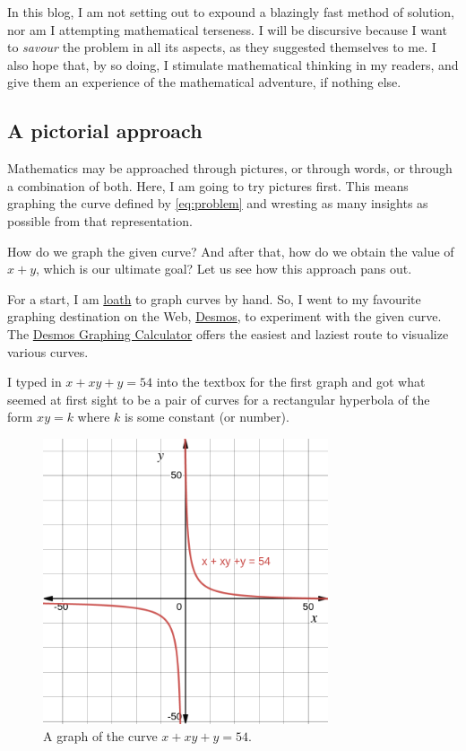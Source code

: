\documentclass[
  a4paper,
]{article}
\begin{document}
In this blog, I am not setting out to expound a blazingly fast method of
solution, nor am I attempting mathematical terseness. I will be
discursive because I want to \emph{savour} the problem in all its
aspects, as they suggested themselves to me. I also hope that, by so
doing, I stimulate mathematical thinking in my readers, and give them an
experience of the mathematical adventure, if nothing else.

\subsection{A pictorial approach}\label{a-pictorial-approach}

Mathematics may be approached through pictures, or through words, or
through a combination of both. Here, I am going to try pictures first.
This means graphing the curve defined by \cref{eq:problem} and wresting
as many insights as possible from that representation.

How do we graph the given curve? And after that, how do we obtain the
value of \(x + y\), which is our ultimate goal? Let us see how this
approach pans out.

For a start, I am \href{https://www.thefreedictionary.com/loath}{loath}
to graph curves by hand. So, I went to my favourite graphing destination
on the Web, \href{https://www.desmos.com}{Desmos}, to experiment with
the given curve. The \href{https://www.desmos.com/calculator}{Desmos
Graphing Calculator} offers the easiest and laziest route to visualize
various curves.

I typed in
\href{https://www.desmos.com/calculator/nwkikstcm6}{\(x + xy + y = 54\)}
into the textbox for the first graph and got what seemed at first sight
to be a pair of curves for a rectangular hyperbola of the form
\(xy = k\) where \(k\) is some constant (or number).

\begin{figure}
\centering
\includegraphics[width=0.75\textwidth,height=\textheight]{images/olympiad-one.png}
\caption{A graph of the curve \(x + xy + y = 54\).}\label{fig:one}
\end{figure}
\end{document}
